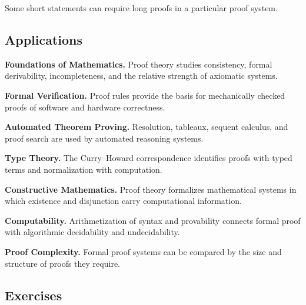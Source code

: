 Some short statements can require long proofs in a particular proof system.

\subsection{Applications}
\label{subsec:proof-theory-applications}

\begin{applicationbox}

\textbf{Foundations of Mathematics.}
Proof theory studies consistency, formal derivability, incompleteness, and
the relative strength of axiomatic systems.

\medskip

\textbf{Formal Verification.}
Proof rules provide the basis for mechanically checked proofs of software
and hardware correctness.

\medskip

\textbf{Automated Theorem Proving.}
Resolution, tableaux, sequent calculus, and proof search are used by
automated reasoning systems.

\medskip

\textbf{Type Theory.}
The Curry--Howard correspondence identifies proofs with typed terms and
normalization with computation.

\medskip

\textbf{Constructive Mathematics.}
Proof theory formalizes mathematical systems in which existence and
disjunction carry computational information.

\medskip

\textbf{Computability.}
Arithmetization of syntax and provability connects formal proof with
algorithmic decidability and undecidability.

\medskip

\textbf{Proof Complexity.}
Formal proof systems can be compared by the size and structure of proofs
they require.

\end{applicationbox}

\subsection{Exercises}
\label{subsec:proof-theory-exercises}

